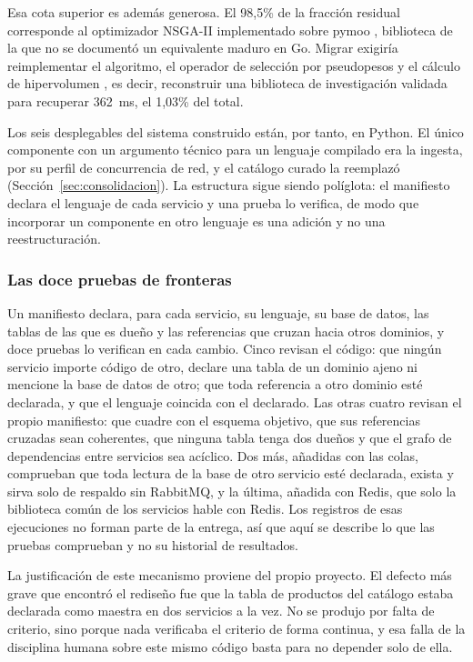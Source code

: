 Esa cota superior es además generosa. El 98,5\% de la fracción residual corresponde al
optimizador NSGA-II \citep{deb_fast_2002} implementado sobre pymoo \citep{blank_pymoo_2020},
biblioteca de la que no se documentó un equivalente maduro en Go. Migrar exigiría
reimplementar el algoritmo, el operador de selección por pseudopesos y el cálculo de
hipervolumen \citep{zitzler_multiobjective_1999}, es decir, reconstruir una biblioteca de
investigación validada para recuperar 362~ms, el 1,03\% del total.

Los seis desplegables del sistema construido están, por tanto, en Python. El único
componente con un argumento técnico para un lenguaje compilado era la ingesta, por su perfil
de concurrencia de red, y el catálogo curado la reemplazó (Sección~\ref{sec:consolidacion}).
La estructura sigue siendo políglota: el manifiesto declara el lenguaje de cada servicio y
una prueba lo verifica, de modo que incorporar un componente en otro lenguaje es una adición
y no una reestructuración.

\subsubsection{Las doce pruebas de fronteras}

Un manifiesto declara, para cada servicio, su lenguaje, su base de datos,
las tablas de las que es dueño y las referencias que cruzan hacia otros dominios, y doce
pruebas lo verifican en cada cambio. Cinco revisan el código: que ningún servicio importe
código de otro, declare una tabla de un dominio ajeno ni mencione la base de datos de otro;
que toda referencia a otro dominio esté declarada, y que el lenguaje coincida con el
declarado. Las otras cuatro revisan el propio manifiesto: que cuadre con el esquema
objetivo, que sus referencias cruzadas sean coherentes, que ninguna tabla tenga dos dueños y
que el grafo de dependencias entre servicios sea acíclico. Dos más, añadidas con las
colas, comprueban que toda lectura de la base de otro servicio esté declarada, exista y sirva
solo de respaldo sin RabbitMQ, y la última, añadida con Redis, que solo la biblioteca común de
los servicios hable con Redis. Los registros de esas
ejecuciones no forman parte de la entrega, así que aquí se describe lo que las pruebas
comprueban y no su historial de resultados.

La justificación de este mecanismo proviene del propio proyecto. El defecto más grave que
encontró el rediseño fue que la tabla de productos del catálogo estaba declarada como
maestra en dos servicios a la vez. No se produjo por falta de criterio, sino porque nada
verificaba el criterio de forma continua, y esa falla de la disciplina humana sobre este
mismo código basta para no depender solo de ella.

